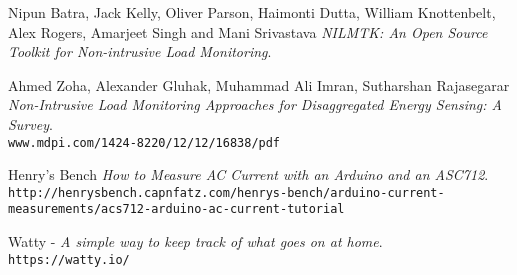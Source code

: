 \begin{thebibliography}{9}
Nipun Batra, Jack Kelly, Oliver Parson, Haimonti Dutta, William Knottenbelt, Alex Rogers, Amarjeet Singh and Mani Srivastava
\textit{NILMTK: An Open Source Toolkit for Non-intrusive Load
            Monitoring}. 

Ahmed Zoha, Alexander Gluhak, Muhammad Ali Imran, Sutharshan Rajasegarar
\textit{Non-Intrusive Load Monitoring Approaches for Disaggregated
    Energy Sensing: A Survey}. 
\\\texttt{www.mdpi.com/1424-8220/12/12/16838/pdf}

Henry's Bench
\textit{How to Measure AC Current with an Arduino and an ASC712}. 
\\\texttt{http://henrysbench.capnfatz.com/henrys-bench/arduino-current-measurements/acs712-arduino-ac-current-tutorial}

Watty - 
\textit{A simple way to keep track of what goes on at home}. 
\\\texttt{https://watty.io/}
            
\end{thebibliography}